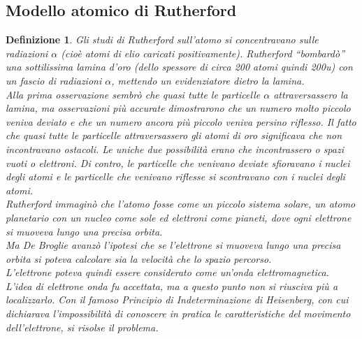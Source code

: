 \documentclass{book}
\newtheorem{defi}{Definizione}[section]
\begin{document}
\subsection{Modello atomico di Rutherford}
\label{sec:Rutherford}
\begin{defi}
  Gli studi di Rutherford sull'atomo si concentravano sulle radiazioni $\alpha$ (cioè atomi di elio caricati positivamente).
  Rutherford “bombardò” una sottilissima lamina d’oro (dello spessore di circa 200 atomi quindi 200u) con un
  fascio di radiazioni $\alpha$, mettendo un evidenziatore dietro la lamina.\\
  Alla prima osservazione sembrò che quasi tutte le particelle $\alpha$ attraversassero la lamina, ma osservazioni più
  accurate dimostrarono che un numero molto piccolo veniva deviato e che un numero ancora più piccolo veniva persino
  riflesso. Il fatto che quasi tutte le particelle attraversassero gli atomi di oro significava che non incontravano
  ostacoli. Le uniche due possibilità erano che incontrassero o spazi vuoti o elettroni. Di contro, le particelle
  che venivano deviate sfioravano i nuclei degli atomi e le particelle che venivano riflesse si scontravano con i
  nuclei degli atomi.\\
  Rutherford immaginò che l’atomo fosse come un piccolo sistema solare, un atomo planetario con un nucleo come sole
  ed elettroni come pianeti, dove ogni elettrone si muoveva lungo una precisa orbita.\\
  Ma De Broglie avanzò l’ipotesi che se l’elettrone si muoveva lungo una precisa orbita si poteva calcolare sia la
  velocità che lo spazio percorso.\\
  L’elettrone poteva quindi essere considerato come un’onda elettromagnetica. L’idea di elettrone onda fu accettata,
  ma a questo punto non si riusciva più a localizzarlo. Con il famoso Principio di Indeterminazione di Heisenberg,
  con cui dichiarava l’impossibilità di conoscere in pratica le caratteristiche del movimento dell’elettrone, si
  risolse il problema.
\end{defi}
\end{document}
